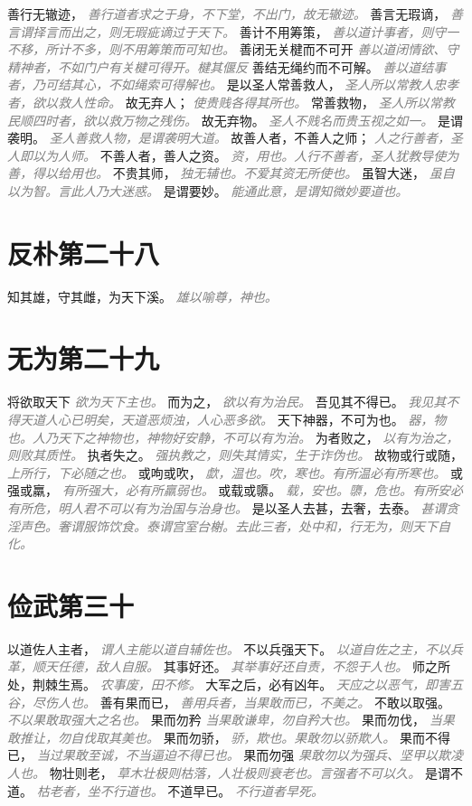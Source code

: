 \documentclass[a4paper,zihao=-4,oneside,landscape,UTF8]{ctexart}
\newcommand{\zhushi}[1]{\scriptsize{\textit{\textcolor{gray}{#1}}}\normalsize}
\begin{document}
善行无辙迹，
\zhushi{善行道者求之于身，不下堂，不出门，故无辙迹。}
善言无瑕谪，
\zhushi{善言谓择言而出之，则无瑕疵谪过于天下。}
善计不用筹策，
\zhushi{善以道计事者，则守一不移，所计不多，则不用筹策而可知也。}
善闭无关楗而不可开
\zhushi{善以道闭情欲、守精神者，不如门户有关楗可得开。楗其偃反}
善结无绳约而不可解。
\zhushi{善以道结事者，乃可结其心，不如绳索可得解也。}
是以圣人常善救人，
\zhushi{圣人所以常教人忠孝者，欲以救人性命。}
故无弃人；
\zhushi{使贵贱各得其所也。}
常善救物，
\zhushi{圣人所以常教民顺四时者，欲以救万物之残伤。}
故无弃物。
\zhushi{圣人不贱名而贵玉视之如一。}
是谓袭明。
\zhushi{圣人善救人物，是谓袭明大道。}
故善人者，不善人之师；
\zhushi{人之行善者，圣人即以为人师。}
不善人者，善人之资。
\zhushi{资，用也。人行不善者，圣人犹教导使为善，得以给用也。}
不贵其师，
\zhushi{独无辅也。不爱其资无所使也。}
虽智大迷，
\zhushi{虽自以为智。言此人乃大迷惑。}
是谓要妙。
\zhushi{能通此意，是谓知微妙要道也。}


\section{反朴第二十八}

知其雄，守其雌，为天下溪。
\zhushi{雄以喻尊，神也。}


\section{无为第二十九}

将欲取天下
\zhushi{欲为天下主也。}
而为之，
\zhushi{欲以有为治民。}
吾见其不得已。
\zhushi{我见其不得天道人心已明矣，天道恶烦浊，人心恶多欲。}
天下神器，不可为也。
\zhushi{器，物也。人乃天下之神物也，神物好安静，不可以有为治。}
为者败之，
\zhushi{以有为治之，则败其质性。}
执者失之。
\zhushi{强执教之，则失其情实，生于诈伪也。}
故物或行或随，
\zhushi{上所行，下必随之也。}
或呴或吹，
\zhushi{歔，温也。吹，寒也。有所温必有所寒也。}
或强或羸，
\zhushi{有所强大，必有所羸弱也。}
或载或隳。
\zhushi{载，安也。隳，危也。有所安必有所危，明人君不可以有为治国与治身也。}
是以圣人去甚，去奢，去泰。
\zhushi{甚谓贪淫声色。奢谓服饰饮食。泰谓宫室台榭。去此三者，处中和，行无为，则天下自化。}


\section{俭武第三十}

以道佐人主者，
\zhushi{谓人主能以道自辅佐也。}
不以兵强天下。
\zhushi{以道自佐之主，不以兵革，顺天任德，敌人自服。}
其事好还。
\zhushi{其举事好还自责，不怨于人也。}
师之所处，荆棘生焉。
\zhushi{农事废，田不修。}
大军之后，必有凶年。
\zhushi{天应之以恶气，即害五谷，尽伤人也。}
善有果而已，
\zhushi{善用兵者，当果敢而已，不美之。}
不敢以取强。
\zhushi{不以果敢取强大之名也。}
果而勿矜
\zhushi{当果敢谦卑，勿自矜大也。}
果而勿伐，
\zhushi{当果敢推让，勿自伐取其美也。}
果而勿骄，
\zhushi{骄，欺也。果敢勿以骄欺人。}
果而不得已，
\zhushi{当过果敢至诚，不当逼迫不得已也。}
果而勿强
\zhushi{果敢勿以为强兵、坚甲以欺凌人也。}
物壮则老，
\zhushi{草木壮极则枯落，人壮极则衰老也。言强者不可以久。}
是谓不道。
\zhushi{枯老者，坐不行道也。}
不道早已。
\zhushi{不行道者早死。}
\end{document}
